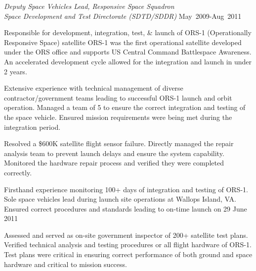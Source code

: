 \documentclass[10pt]{article}
\begin{document}
\begin{lonelist}
\item[] \textit{Deputy Space Vehicles Lead, Responsive Space Squadron\\}
	\textit{Space Development and Test Directorate (SDTD/SDDR)}%
    \hfill {May~2009-Aug~2011}
    
    \begin{innerlist}
        \item Responsible for development, integration, test, \& launch of ORS-1 (Operationally Responsive Space) satellite
         ORS-1 was the first operational satellite developed under the ORS office and supports US Central Command Battlespace Awareness.
         An accelerated development cycle allowed for the integration and launch in under 2 years.
        \item Extensive experience with technical management of diverse contractor/government teams leading to successful ORS-1 launch and orbit operation.
        Managed a team of 5 to ensure the correct integration and testing of the space vehicle.
        Ensured mission requirements were being met during the integration period. 
        \item Resolved a \$600K satellite flight sensor failure.
        Directly managed the repair analysis team to prevent launch delays and ensure the system capability.
        Monitored the hardware repair process and verified they were completed correctly.
		\item Firsthand experience monitoring 100+ days of integration and testing of ORS-1.
		Sole space vehicles lead during launch site operations at Wallops Island, VA.
		Ensured correct procedures and standards leading to on-time launch on 29 June 2011
		\item Assessed and served as on-site government inspector of 200+ satellite test plans.
		 Verified technical analysis and testing procedures or all flight hardware of ORS-1. 
		 Test plans were critical in ensuring correct performance of both ground and space hardware and critical to mission success.
    \end{innerlist}

\end{lonelist} %
\end{document}
